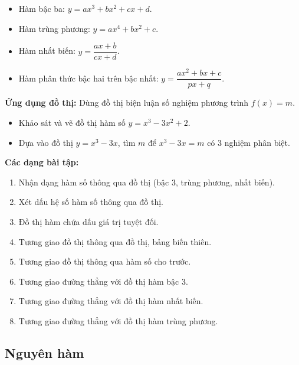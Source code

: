 \documentclass[12pt,a4paper]{article}
\begin{document}
\begin{tinhchat}[title={Các dạng hàm số thường khảo sát}]
  \begin{itemize}
    \item Hàm bậc ba: $y = ax^3 + bx^2 + cx + d$.
    \item Hàm trùng phương: $y = ax^4 + bx^2 + c$.
    \item Hàm nhất biến: $y = \dfrac{ax + b}{cx + d}$.
    \item Hàm phân thức bậc hai trên bậc nhất: $y = \dfrac{ax^2 + bx + c}{px + q}$.
  \end{itemize}
\end{tinhchat}

\begin{luuy}
  \textbf{Ứng dụng đồ thị:} Dùng đồ thị biện luận số nghiệm phương trình $f(x) = m$.
\end{luuy}

\begin{vidu}
  \begin{itemize}
    \item Khảo sát và vẽ đồ thị hàm số $y = x^3 - 3x^2 + 2$.
    \item Dựa vào đồ thị $y = x^3 - 3x$, tìm $m$ để $x^3 - 3x = m$ có 3 nghiệm phân biệt.
  \end{itemize}
\end{vidu}

\medskip\noindent\textbf{Các dạng bài tập:}
\begin{enumerate}[label=\textbf{Dạng \arabic*:}, leftmargin=*, align=left]
  \item Nhận dạng hàm số thông qua đồ thị (bậc 3, trùng phương, nhất biến).
  \item Xét dấu hệ số hàm số thông qua đồ thị.
  \item Đồ thị hàm chứa dấu giá trị tuyệt đối.
  \item Tương giao đồ thị thông qua đồ thị, bảng biến thiên.
  \item Tương giao đồ thị thông qua hàm số cho trước.
  \item Tương giao đường thẳng với đồ thị hàm bậc 3.
  \item Tương giao đường thẳng với đồ thị hàm nhất biến.
  \item Tương giao đường thẳng với đồ thị hàm trùng phương.
\end{enumerate}

\subsection{Nguyên hàm}
\end{document}
